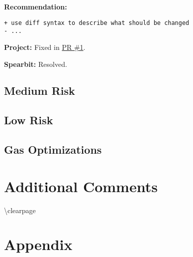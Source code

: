 \textbf{Recommendation:}

\begin{verbatim}
+ use diff syntax to describe what should be changed
- ...
\end{verbatim}

\textbf{Project:} Fixed in \href{Https://github.com/actuallink}{PR \#1}.

\textbf{Spearbit:} Resolved.

\subsection{Medium Risk}\label{medium-risk}

\subsection{Low Risk}\label{low-risk}

\subsection{Gas Optimizations}\label{gas-optimizations}

\section{Additional Comments}\label{additional-comments}

\textbackslash clearpage

\section{Appendix}\label{appendix}
